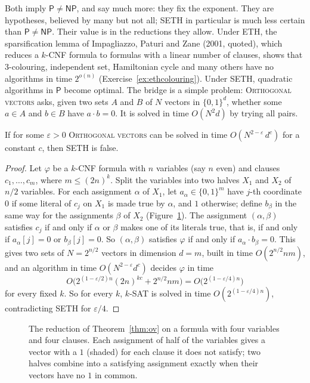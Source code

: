 Both imply $\mathsf P\ne\mathsf{NP}$, and say much more: they fix the exponent. They are hypotheses, believed by many but not all; SETH in particular is much less certain than $\mathsf P\ne\mathsf{NP}$. Their value is in the reductions they allow. Under ETH, the sparsification lemma of Impagliazzo, Paturi and Zane (2001, quoted), which reduces a $k$-CNF formula to formulas with a linear number of clauses, shows that 3-colouring, independent set, Hamiltonian cycle and many others have no algorithms in time $2^{o(n)}$ (Exercise~\ref{ex:ethcolouring}). Under SETH, quadratic algorithms in $\mathsf P$ become optimal. The bridge is a simple problem: \textup{\textsc{Orthogonal vectors}} asks, given two sets $A$ and $B$ of $N$ vectors in $\{0,1\}^d$, whether some $a\in A$ and $b\in B$ have $a\cdot b=0$. It is solved in time $O(N^2d)$ by trying all pairs.

\begin{theorem}[Williams 2005]\label{thm:ov}
If for some $\varepsilon>0$ \textup{\textsc{Orthogonal vectors}} can be solved in time $O(N^{2-\varepsilon}\,d^{c})$ for a constant $c$, then SETH is false.
\end{theorem}

\begin{proof}
Let $\varphi$ be a $k$-CNF formula with $n$ variables (say $n$ even) and clauses $c_1,\dots,c_m$, where $m\le(2n)^k$. Split the variables into two halves $X_1$ and $X_2$ of $n/2$ variables. For each assignment $\alpha$ of $X_1$, let $a_\alpha\in\{0,1\}^m$ have $j$-th coordinate $0$ if some literal of $c_j$ on $X_1$ is made true by $\alpha$, and $1$ otherwise; define $b_\beta$ in the same way for the assignments $\beta$ of $X_2$ (Figure~\ref{fig:ov}). The assignment $(\alpha,\beta)$ satisfies $c_j$ if and only if $\alpha$ or $\beta$ makes one of its literals true, that is, if and only if $a_\alpha[j]=0$ or $b_\beta[j]=0$. So $(\alpha,\beta)$ satisfies $\varphi$ if and only if $a_\alpha\cdot b_\beta=0$. This gives two sets of $N=2^{n/2}$ vectors in dimension $d=m$, built in time $O(2^{n/2}nm)$, and an algorithm in time $O(N^{2-\varepsilon}d^c)$ decides $\varphi$ in time
\[
O\bigl(2^{(1-\varepsilon/2)n}(2n)^{kc}+2^{n/2}nm\bigr)=O\bigl(2^{(1-\varepsilon/4)n}\bigr)
\]
for every fixed $k$. So for every $k$, $k$-SAT is solved in time $O(2^{(1-\varepsilon/4)n})$, contradicting SETH for $\varepsilon/4$.
\end{proof}

\begin{figure}[ht]
\centering
{}
\caption{The reduction of Theorem~\ref{thm:ov} on a formula with four variables and four clauses. Each assignment of half of the variables gives a vector with a $1$ (shaded) for each clause it does not satisfy; two halves combine into a satisfying assignment exactly when their vectors have no $1$ in common.}
\label{fig:ov}
\end{figure}

